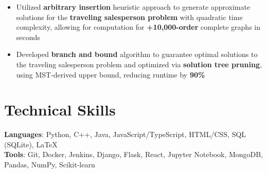 \documentclass[letterpaper,11pt]{article}
\begin{document}
\begin{itemize}
    \item Utilized \textbf{arbitrary insertion} heuristic approach to generate
        approximate solutions for the \textbf{traveling salesperson problem} with
        quadratic time complexity, allowing for computation for \textbf{+10,000-order}
        complete graphs in seconds
    \item Developed \textbf{branch and bound} algorithm to guarantee optimal solutions to
        the traveling salesperson problem and optimized via \textbf{solution tree
        pruning}, using MST-derived upper bound, reducing runtime by \textbf{90\%}
\end{itemize}
\section{Technical Skills}
\textbf{Languages}: Python, C++, Java, JavaScript/TypeScript, HTML/CSS,
SQL (SQLite), \LaTeX \\
\textbf{Tools}: Git, Docker, Jenkins, Django, Flask, React,
Jupyter Notebook, MongoDB, Pandas, NumPy, Scikit-learn
\end{document}
